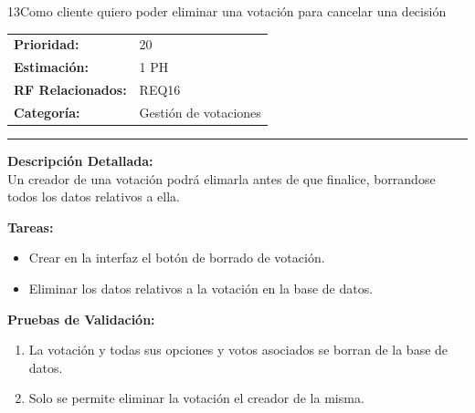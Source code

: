 \begin{hu_card}{13}{Como cliente quiero poder eliminar una votación para cancelar una decisión}
    \begin{tabularx}{\linewidth}{l X}
        \textbf{Prioridad:}   & 20\\
        \textbf{Estimación:}  & 1 PH \\
        \textbf{RF Relacionados:} & REQ16 \\
        \textbf{Categoría:} & Gestión de votaciones \\
    \end{tabularx}

    \vspace{2mm}
    \hrule
    \vspace{2mm}

    \textbf{Descripción Detallada:} \\
    Un creador de una votación podrá elimarla antes de que finalice, borrandose todos los datos relativos a ella.

    \vspace{2mm}
    \textbf{Tareas:}
    \begin{itemize}[noitemsep, topsep=0pt]
        \item Crear en la interfaz el botón de borrado de votación.
        \item Eliminar los datos relativos a la votación en la base de datos.
    \end{itemize}

    \vspace{2mm}
    \textbf{Pruebas de Validación:}
    \begin{enumerate}[noitemsep, topsep=0pt]
        \item La votación y todas sus opciones y votos asociados se borran de la base de datos.
        \item Solo se permite eliminar la votación el creador de la misma.
    \end{enumerate}
\end{hu_card}

